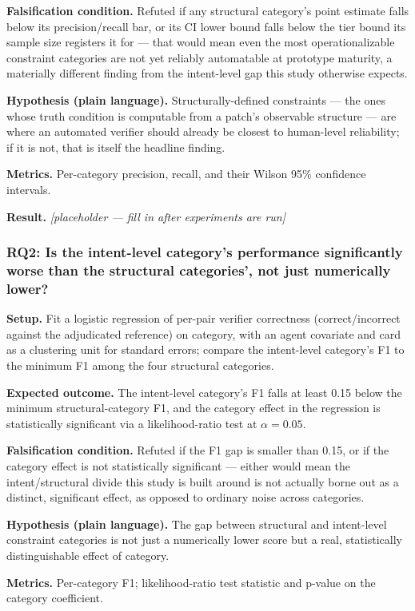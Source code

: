 \documentclass[11pt]{article}
\newcommand{\ph}{\textit{[placeholder --- fill in after experiments are run]}}
\begin{document}
\textbf{Falsification condition.} Refuted if any structural category's point estimate falls below its precision/recall bar, or its CI lower bound falls below the tier bound its sample size registers it for --- that would mean even the most operationalizable constraint categories are not yet reliably automatable at prototype maturity, a materially different finding from the intent-level gap this study otherwise expects.

\textbf{Hypothesis (plain language).} Structurally-defined constraints --- the ones whose truth condition is computable from a patch's observable structure --- are where an automated verifier should already be closest to human-level reliability; if it is not, that is itself the headline finding.

\textbf{Metrics.} Per-category precision, recall, and their Wilson 95\% confidence intervals.

\textbf{Result.} \ph

\subsubsection{RQ2: Is the intent-level category's performance significantly worse than the structural categories', not just numerically lower?}
\textbf{Setup.} Fit a logistic regression of per-pair verifier correctness (correct/incorrect against the adjudicated reference) on category, with an agent covariate and card as a clustering unit for standard errors; compare the intent-level category's F1 to the minimum F1 among the four structural categories.

\textbf{Expected outcome.} The intent-level category's F1 falls at least 0.15 below the minimum structural-category F1, and the category effect in the regression is statistically significant via a likelihood-ratio test at $\alpha = 0.05$.

\textbf{Falsification condition.} Refuted if the F1 gap is smaller than 0.15, or if the category effect is not statistically significant --- either would mean the intent/structural divide this study is built around is not actually borne out as a distinct, significant effect, as opposed to ordinary noise across categories.

\textbf{Hypothesis (plain language).} The gap between structural and intent-level constraint categories is not just a numerically lower score but a real, statistically distinguishable effect of category.

\textbf{Metrics.} Per-category F1; likelihood-ratio test statistic and p-value on the category coefficient.
\end{document}
